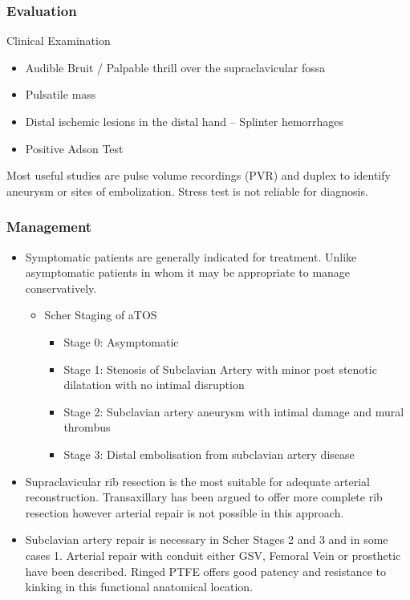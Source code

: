 \documentclass[
]{book}
\begin{document}
\hypertarget{evaluation-11}{%
\subsubsection{Evaluation}\label{evaluation-11}}

Clinical Examination

\begin{itemize}
\item
  Audible Bruit / Palpable thrill over the supraclavicular fossa
\item
  Pulsatile mass
\item
  Distal ischemic lesions in the distal hand -- Splinter hemorrhages
\item
  Positive Adson Test
\end{itemize}

Most useful studies are pulse volume recordings (PVR) and duplex to
identify aneurysm or sites of embolization. Stress test is not reliable
for diagnosis. \citep{vemuriClinicalPresentationManagement2017, criadoSpectrumArterialCompression2010}

\hypertarget{management-12}{%
\subsubsection{Management}\label{management-12}}

\begin{itemize}
\item
  Symptomatic patients are generally indicated for treatment. Unlike
  asymptomatic patients in whom it may be appropriate to manage
  conservatively. \citep{boll122ThoracicOutlet2019}

  \begin{itemize}
  \item
    Scher Staging of aTOS

    \begin{itemize}
    \item
      Stage 0: Asymptomatic
    \item
      Stage 1: Stenosis of Subclavian Artery with minor post
      stenotic dilatation with no intimal disruption
    \item
      Stage 2: Subclavian artery aneurysm with intimal damage and
      mural thrombus
    \item
      Stage 3: Distal embolisation from subclavian artery disease
    \end{itemize}
  \end{itemize}
\item
  Supraclavicular rib resection is the most suitable for adequate
  arterial reconstruction. Transaxillary has been argued to offer more
  complete rib resection however arterial repair is not possible in
  this approach.
\item
  Subclavian artery repair is necessary in Scher Stages 2 and 3 and in
  some cases 1. Arterial repair with conduit either GSV, Femoral Vein
  or prosthetic have been described. Ringed PTFE offers good patency
  and resistance to kinking in this functional anatomical location.
\end{itemize}
\end{document}
